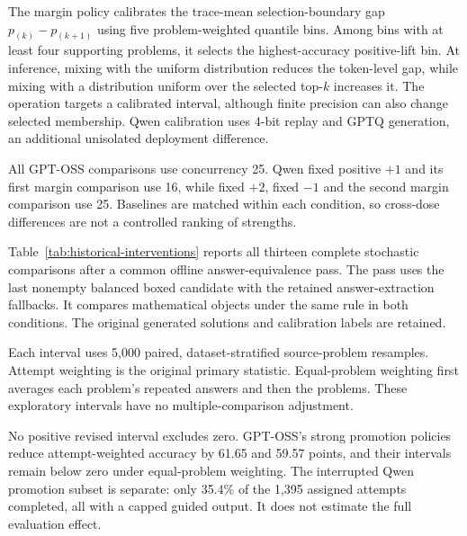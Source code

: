 The margin policy calibrates the trace-mean selection-boundary gap $p_{(k)}-p_{(k+1)}$ using five problem-weighted quantile bins.
%
Among bins with at least four supporting problems, it selects the highest-accuracy positive-lift bin.
%
At inference, mixing with the uniform distribution reduces the token-level gap, while mixing with a distribution uniform over the selected top-$k$ increases it.
%
The operation targets a calibrated interval, although finite precision can also change selected membership.
%
Qwen calibration uses 4-bit replay and GPTQ generation, an additional unisolated deployment difference.
%

All GPT-OSS comparisons use concurrency 25.
%
Qwen fixed positive $+1$ and its first margin comparison use 16, while fixed $+2$, fixed $-1$ and the second margin comparison use 25.
%
Baselines are matched within each condition, so cross-dose differences are not a controlled ranking of strengths.
%

Table~\ref{tab:historical-interventions} reports all thirteen complete stochastic comparisons after a common offline answer-equivalence pass.
%
The pass uses the last nonempty balanced boxed candidate with the retained answer-extraction fallbacks.
%
It compares mathematical objects under the same rule in both conditions.
%
The original generated solutions and calibration labels are retained.
%

Each interval uses 5,000 paired, dataset-stratified source-problem resamples.
%
Attempt weighting is the original primary statistic.
%
Equal-problem weighting first averages each problem's repeated answers and then the problems.
%
These exploratory intervals have no multiple-comparison adjustment.
%

No positive revised interval excludes zero.
%
GPT-OSS's strong promotion policies reduce attempt-weighted accuracy by 61.65 and 59.57 points, and their intervals remain below zero under equal-problem weighting.
%
The interrupted Qwen promotion subset is separate: only 35.4\% of the 1,395 assigned attempts completed, all with a capped guided output.
%
It does not estimate the full evaluation effect.
%
